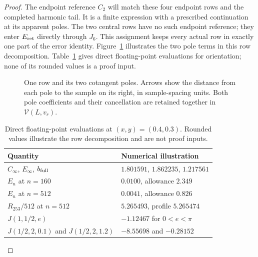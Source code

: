 \begin{proof}
The endpoint reference $C_2$ will match these four endpoint rows and
the completed harmonic tail. It is a finite expression with a prescribed
continuation at its apparent poles. The two central rows have no such
endpoint reference; they enter $E_{\rm ret}$ directly through $J_6$.
This assignment keeps every actual row in exactly one part of the
error identity.
Figure~\ref{uc:row-poles} illustrates the two pole terms in this row
decomposition. Table~\ref{uc:worked-values} gives direct floating-point
evaluations for orientation; none of its rounded values is a proof input.
\begin{figure}[ht]
\centering
{}
\caption{One row and its two cotangent poles. Arrows show the distance
from each pole to the sample on its right, in sample-spacing units.
Both pole coefficients and their cancellation
are retained together in $\mathcal V(L,v_r)$.}
\label{uc:row-poles}
\end{figure}
\begin{table}[ht]
\centering\small
\caption{Direct floating-point evaluations at $(x,y)=(0.4,0.3)$.
Rounded values illustrate the row decomposition and are not proof inputs.}
\label{uc:worked-values}
\begin{tabular}{@{}ll@{}}\toprule
Quantity & Numerical illustration\\\midrule
$C_\infty$, $E_\infty$, $b_{\rm full}$ & $1.801591$, $1.862235$, $1.217561$\\
$E_n$ at $n=160$ & $0.0100$, allowance $2.349$\\
$E_n$ at $n=512$ & $0.0041$, allowance $0.826$\\
$R_{253}/512$ at $n=512$ & $5.265493$, profile $5.265474$\\
$J(1,1/2,e)$ & $-1.12467$ for $0<e<\pi$\\
$J(1/2,2,0.1)$ and $J(1/2,2,1.2)$ & $-8.55698$ and $-0.28152$\\
\bottomrule\end{tabular}
\end{table}


\end{proof}
